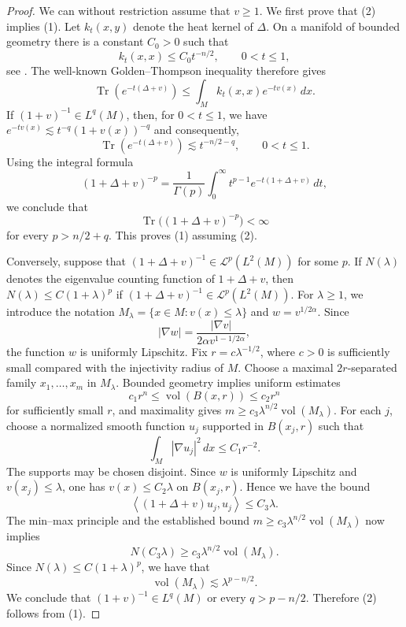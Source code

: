 \documentclass[a4paper,reqno]{amsart}
\numberwithin{equation}{section}
\def\Tr{\operatorname{Tr}}
\theoremstyle{definition}
\theoremstyle{remark}
\begin{document}
\begin{proof}
We can without restriction assume that $v\geq 1$. We first prove that (2) implies (1). Let $k_t(x,y)$ denote the heat kernel of $\Delta$. On a manifold of bounded geometry there is a constant $C_0>0$ such that 
\[
k_t(x,x)\leq C_0t^{-n/2},
\qquad 0<t\leq 1,
\]
see \cite{chegrotay}. The well-known Golden--Thompson inequality therefore gives
\[\Tr(e^{-t(\Delta+v)}) \leq \int_M k_t(x,x)e^{-tv(x)}\,dx.\]
If $(1+v)^{-1}\in L^q(M)$, then, for $0<t\leq 1$, we have $e^{-tv(x)}\lesssim t^{-q}(1+v(x))^{-q}$ and consequently,
\[\Tr(e^{-t(\Delta+v)})\lesssim t^{-n/2-q}, \qquad 0<t\leq 1.\]
Using the integral formula
\[(1+\Delta+v)^{-p}=\frac{1}{\Gamma(p)}\int_0^\infty t^{p-1}e^{-t(1+\Delta+v)}\,dt,\]
we conclude that
\[
\operatorname{Tr}\bigl((1+\Delta+v)^{-p}\bigr)<\infty
\]
for every $p>n/2+q$. This proves (1) assuming (2).

Conversely, suppose that $(1+\Delta+v)^{-1}\in\mathcal L^p(L^2(M))$ for some $p$. If $N(\lambda)$ denotes the eigenvalue counting
function of $1+\Delta+v$, then $N(\lambda)\leq C(1+\lambda)^p$ if $(1+\Delta+v)^{-1}\in\mathcal L^p(L^2(M))$. For $\lambda\geq 1$, we introduce the notation $M_\lambda=\{x\in M:v(x)\leq\lambda\}$ and $w=v^{1/2\alpha}$. Since
\[|\nabla  w| =\frac{|\nabla v|}{ 2\alpha v^{1-1/2\alpha}},\]
the function $w$ is uniformly Lipschitz. Fix $r=c\lambda^{-1/2}$, where $c>0$ is sufficiently small compared with the injectivity radius of $M$. Choose a maximal $2r$-separated family $x_1,\ldots,x_m$ in $M_\lambda$. Bounded geometry implies uniform estimates
\[ c_1r^n\leq \operatorname{vol}(B(x,r)) \leq c_2r^n\]
for sufficiently small $r$, and maximality gives $m\geq c_3\lambda^{n/2}\operatorname{vol}(M_\lambda)$. For each $j$, choose a normalized smooth function $u_j$ supported in $B(x_j,r)$ such that
\[\int_M|\nabla u_j|^2\,dx\leq C_1r^{-2}.\]
The supports may be chosen disjoint. Since $w$ is uniformly Lipschitz and $v(x_j)\leq\lambda$, one has $v(x)\leq C_2\lambda$ on $B(x_j,r)$. Hence we have the bound
\[ \left\langle (1+\Delta+v)u_j,u_j \right\rangle \leq C_3\lambda.\]
The min--max principle \cite{franklapweid} and the established  bound $m\geq c_3\lambda^{n/2}\operatorname{vol}(M_\lambda)$ now implies 
\[ N(C_3\lambda) \geq c_3\lambda^{n/2}\operatorname{vol}(M_\lambda).\]
Since $N(\lambda)\leq C(1+\lambda)^p$, we have that
\[\operatorname{vol}(M_\lambda) \lesssim\lambda^{p-n/2}.\]
We conclude that $(1+v)^{-1}\in L^q(M)$ or every $q>p-n/2$. Therefore (2) follows from (1).
\end{proof}
\end{document}

